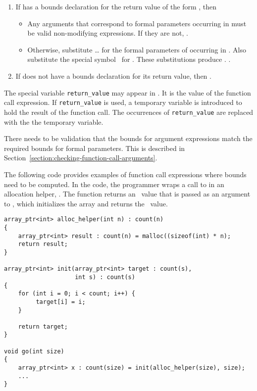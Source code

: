 \begin{enumerate}
\item
  If  has a bounds declaration for the return value of the form
   , then

  \begin{itemize}
  \item
    Any arguments that correspond to formal parameters occurring in
     must be valid non-modifying expressions. If they are
    not, .
  \item
    Otherwise, substitute  \ldots{}  for the formal
    parameters of  occurring in . Also substitute the
    special symbol \exprcurrentvalue\ for
    . These substitutions produce .
    .
  \end{itemize}
\item
  If  does not have a bounds declaration for its return value,
  then .
\end{enumerate}

The special variable \lstinline|return_value| may appear in . It
is the value of the function call expression. If \lstinline|return_value|
is used, a temporary variable is introduced to hold the result of the
function call.  The occurrences of \lstinline|return_value| are replaced
with the the temporary variable.

There needs to be validation that the bounds for argument expressions
match the required bounds for formal parameters. This is described in
Section~\ref{section:checking-function-call-arguments}.

The following code provides examples of function call expressions where
bounds need to be computed. In the code, the programmer wraps a call to
 in an allocation helper, . The
function  returns an \arrayptr\ value
that is passed as an argument to , which initializes the array
and returns the \arrayptr\ value.
\begin{lstlisting}
array_ptr<int> alloc_helper(int n) : count(n)
{
    array_ptr<int> result : count(n) = malloc((sizeof(int) * n);
    return result;
}

array_ptr<int> init(array_ptr<int> target : count(s), 
                    int s) : count(s)
{
    for (int i = 0; i < count; i++) {
         target[i] = i;
    }

    return target;
}

void go(int size) 
{
    array_ptr<int> x : count(size) = init(alloc_helper(size), size);
    ...
}
\end{lstlisting}

